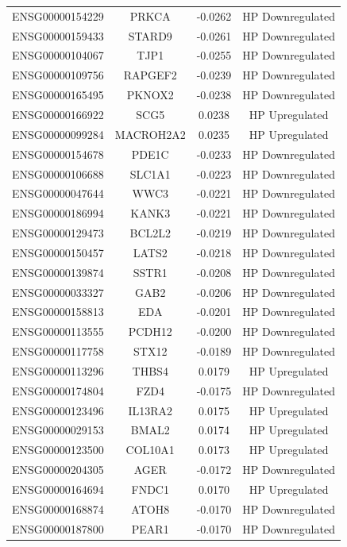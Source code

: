 \documentclass[
]{article}
\begin{document}
\begin{singlespace}
\begin{longtable}[t]{lccc}
ENSG00000154229 & PRKCA & -0.0262 & HP Downregulated\\
ENSG00000159433 & STARD9 & -0.0261 & HP Downregulated\\
ENSG00000104067 & TJP1 & -0.0255 & HP Downregulated\\
\addlinespace
ENSG00000109756 & RAPGEF2 & -0.0239 & HP Downregulated\\
ENSG00000165495 & PKNOX2 & -0.0238 & HP Downregulated\\
ENSG00000166922 & SCG5 & 0.0238 & HP Upregulated\\
ENSG00000099284 & MACROH2A2 & 0.0235 & HP Upregulated\\
ENSG00000154678 & PDE1C & -0.0233 & HP Downregulated\\
\addlinespace
ENSG00000106688 & SLC1A1 & -0.0223 & HP Downregulated\\
ENSG00000047644 & WWC3 & -0.0221 & HP Downregulated\\
ENSG00000186994 & KANK3 & -0.0221 & HP Downregulated\\
ENSG00000129473 & BCL2L2 & -0.0219 & HP Downregulated\\
ENSG00000150457 & LATS2 & -0.0218 & HP Downregulated\\
\addlinespace
ENSG00000139874 & SSTR1 & -0.0208 & HP Downregulated\\
ENSG00000033327 & GAB2 & -0.0206 & HP Downregulated\\
ENSG00000158813 & EDA & -0.0201 & HP Downregulated\\
ENSG00000113555 & PCDH12 & -0.0200 & HP Downregulated\\
ENSG00000117758 & STX12 & -0.0189 & HP Downregulated\\
\addlinespace
ENSG00000113296 & THBS4 & 0.0179 & HP Upregulated\\
ENSG00000174804 & FZD4 & -0.0175 & HP Downregulated\\
ENSG00000123496 & IL13RA2 & 0.0175 & HP Upregulated\\
ENSG00000029153 & BMAL2 & 0.0174 & HP Upregulated\\
ENSG00000123500 & COL10A1 & 0.0173 & HP Upregulated\\
\addlinespace
ENSG00000204305 & AGER & -0.0172 & HP Downregulated\\
ENSG00000164694 & FNDC1 & 0.0170 & HP Upregulated\\
ENSG00000168874 & ATOH8 & -0.0170 & HP Downregulated\\
ENSG00000187800 & PEAR1 & -0.0170 & HP Downregulated\\

\end{longtable}
\end{singlespace}
\end{document}
